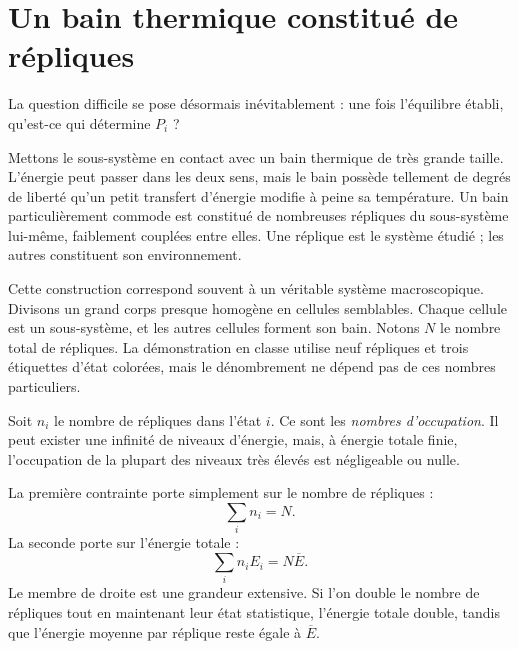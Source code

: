 \section{Un bain thermique constitué de répliques}

La question difficile se pose désormais inévitablement : une fois l’équilibre établi, qu’est-ce qui détermine \(P_i\) ?

Mettons le sous-système en contact avec un bain thermique de très grande taille. L’énergie peut passer dans les deux sens, mais le bain possède tellement de degrés de liberté qu’un petit transfert d’énergie modifie à peine sa température. Un bain particulièrement commode est constitué de nombreuses répliques du sous-système lui-même, faiblement couplées entre elles. Une réplique est le système étudié ; les autres constituent son environnement.

Cette construction correspond souvent à un véritable système macroscopique. Divisons un grand corps presque homogène en cellules semblables. Chaque cellule est un sous-système, et les autres cellules forment son bain. Notons \(N\) le nombre total de répliques. La démonstration en classe utilise neuf répliques et trois étiquettes d’état colorées, mais le dénombrement ne dépend pas de ces nombres particuliers.

Soit \(n_i\) le nombre de répliques dans l’état \(i\). Ce sont les \emph{nombres d’occupation}. Il peut exister une infinité de niveaux d’énergie, mais, à énergie totale finie, l’occupation de la plupart des niveaux très élevés est négligeable ou nulle.

La première contrainte porte simplement sur le nombre de répliques :
\begin{equation}
 \sum_i n_i=N.
 \label{eq:sm3-number-constraint}
\end{equation}
La seconde porte sur l’énergie totale :
\begin{equation}
 \sum_i n_iE_i=N\overline E.
 \label{eq:sm3-total-energy-constraint}
\end{equation}
Le membre de droite est une grandeur extensive. Si l’on double le nombre de répliques tout en maintenant leur état statistique, l’énergie totale double, tandis que l’énergie moyenne par réplique reste égale à \(\overline E\).

\begin{classroomqa}
\end{classroomqa}

